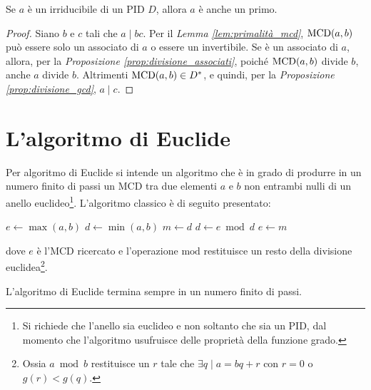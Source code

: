 \documentclass[11pt]{scrbook}
\begin{document}
\begin{theorem}
    \label{th:irriducibili_primi}
    Se $a$ è un irriducibile di un PID $D$, allora $a$ è anche un primo.
\end{theorem}

\begin{proof}
    Siano $b$ e $c$ tali che $a \mid bc$. Per il \textit{Lemma \ref{lem:primalità_mcd}},
    $\operatorname{MCD}(a,b)$ può essere solo un associato di $a$ o essere un invertibile. Se è
    un associato di $a$, allora, per la \textit{Proposizione \ref{prop:divisione_associati}}, poiché $\operatorname{MCD}(a,b)$ divide $b$, anche $a$ divide $b$.
    Altrimenti $\operatorname{MCD}(a,b) \in D^*$, e quindi, per la \textit{Proposizione \ref{prop:divisione_gcd}}, $a \mid c$.
\end{proof}

\section{L'algoritmo di Euclide}

Per algoritmo di Euclide si intende un algoritmo che è in grado di
produrre in un numero finito di passi un MCD tra due elementi
$a$ e $b$ non entrambi nulli di un anello euclideo\footnote{Si richiede che l'anello sia
    euclideo e non soltanto che sia un PID, dal momento che l'algoritmo
    usufruisce delle proprietà della funzione grado.}. L'algoritmo
classico è di seguito presentato:

\newpage

\begin{algorithm}
    $e \gets \max(a,b)$\;
    $d \gets \min(a,b)$\;
    \BlankLine\BlankLine
    {
        $m \gets d$\;
        $d \gets e \bmod d$\;
        $e \gets m$\;
    }
\end{algorithm}

dove $e$ è l'MCD ricercato e l'operazione $\mathrm{mod}$ restituisce un resto della
divisione euclidea\footnote{Ossia $a \bmod b$ restituisce un $r$ tale che $\exists q
        \mid a = bq+r$ con $r=0$ o $g(r)<g(q)$.}.

\begin{lemma}
    \label{lem:euclide_finito}
    L'algoritmo di Euclide termina sempre in un numero finito di passi.
\end{lemma}
\end{document}
